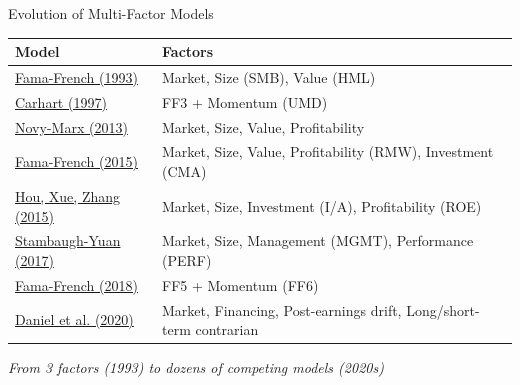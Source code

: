 \documentclass{beamer}
\begin{document}
\begin{frame}{Evolution of Multi-Factor Models}
    \begin{table}
        \scriptsize
        \begin{tabular}{p{3.5cm}p{6cm}}
            \toprule
            \textbf{Model} & \textbf{Factors} \\
            \midrule
            \textcolor{blue}{\href{https://doi.org/10.1016/0304-405X(93)90023-5}{Fama-French (1993)}} & Market, Size (SMB), Value (HML) \\[0.2cm]
            \textcolor{blue}{\href{https://doi.org/10.1111/j.1540-6261.1997.tb03808.x}{Carhart (1997)}} & FF3 + Momentum (UMD) \\[0.2cm]
            \textcolor{blue}{\href{https://doi.org/10.1016/j.jfineco.2013.01.003}{Novy-Marx (2013)}} & Market, Size, Value, Profitability \\[0.2cm]
            \textcolor{blue}{\href{https://doi.org/10.1016/j.jfineco.2014.02.010}{Fama-French (2015)}} & Market, Size, Value, Profitability (RMW), Investment (CMA) \\[0.2cm]
            \textcolor{blue}{\href{https://doi.org/10.1093/rfs/hhu068}{Hou, Xue, Zhang (2015)}} & Market, Size, Investment (I/A), Profitability (ROE) \\[0.2cm]
            \textcolor{blue}{\href{https://doi.org/10.1093/rfs/hhw107}{Stambaugh-Yuan (2017)}} & Market, Size, Management (MGMT), Performance (PERF) \\[0.2cm]
            \textcolor{blue}{\href{https://doi.org/10.1016/j.jfineco.2018.02.012}{Fama-French (2018)}} & FF5 + Momentum (FF6) \\[0.2cm]
            \textcolor{blue}{\href{https://doi.org/10.1093/rfs/hhz069}{Daniel et al. (2020)}} & Market, Financing, Post-earnings drift, Long/short-term contrarian \\
            \bottomrule
        \end{tabular}
    \end{table}
    
    
    \textit{From 3 factors (1993) to dozens of competing models (2020s)}
\end{frame}
\end{document}
